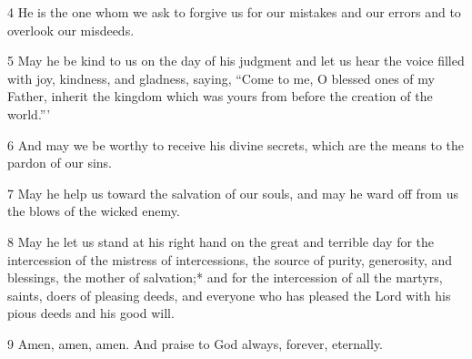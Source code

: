 \par 4 He is the one whom we ask to forgive us for our mistakes and our errors and to overlook our misdeeds. 

\par 5 May he be kind to us on the day of his judgment and let us hear the voice filled with joy, kindness, and gladness, saying, “Come to me, O blessed ones of my Father, inherit the kingdom which was yours from before the creation of the world.”’ 

\par 6 And may we be worthy to receive his divine secrets, which are the means to the pardon of our sins. 

\par 7 May he help us toward the salvation of our souls, and may he ward off from us the blows of the wicked enemy. 

\par 8 May he let us stand at his right hand on the great and terrible day for the intercession of the mistress of intercessions, the source of purity, generosity, and blessings, the mother of salvation;* and for the intercession of all the martyrs, saints, doers of pleasing deeds, and everyone who has pleased the Lord with his pious deeds and his good will. 

\par 9 Amen, amen, amen. And praise to God always, forever, eternally. 


